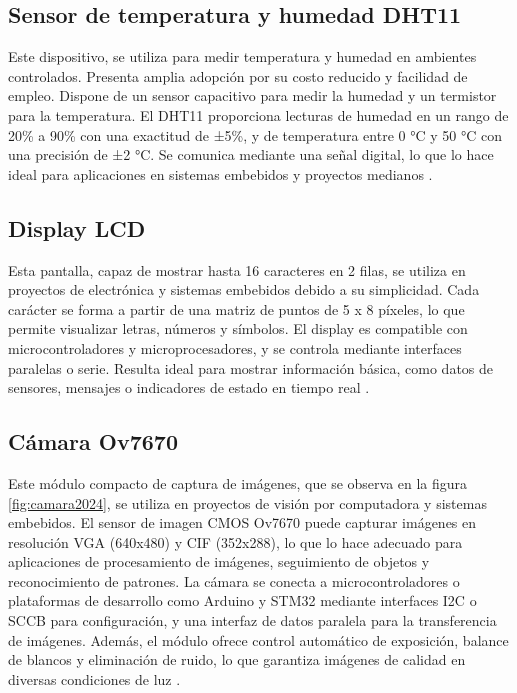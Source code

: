 \subsection{Sensor de temperatura y humedad DHT11}
\label{subsec:dht11}

Este dispositivo, se utiliza para medir temperatura y humedad en ambientes controlados. Presenta amplia adopción por su costo reducido y facilidad de empleo. Dispone de un sensor capacitivo para medir la humedad y un termistor para la temperatura. El DHT11 proporciona lecturas de humedad en un rango de 20\% a 90\% con una exactitud de ±5\%, y de temperatura entre 0 °C y 50 °C con una precisión de ±2 °C. Se comunica mediante una señal digital, lo que lo hace ideal para aplicaciones en sistemas embebidos y proyectos medianos \citep{WEBSITE:Dht112024}.

\subsection{Display LCD}
\label{subsec:DisplayLCD}

Esta pantalla, capaz de mostrar hasta 16 caracteres en 2 filas, se utiliza en proyectos de electrónica y sistemas embebidos debido a su simplicidad. Cada carácter se forma a partir de una matriz de puntos de 5 x 8 píxeles, lo que permite visualizar letras, números y símbolos. El display es compatible con microcontroladores y microprocesadores, y se controla mediante interfaces paralelas o serie. Resulta ideal para mostrar información básica, como datos de sensores, mensajes o indicadores de estado en tiempo real \citep{WEBSITE:lcd2024}.

\subsection{Cámara Ov7670}
\label{subsec:camara}

Este módulo compacto de captura de imágenes, que se observa en la figura \ref{fig:camara2024}, se utiliza en proyectos de visión por computadora y sistemas embebidos. El sensor de imagen CMOS Ov7670 puede capturar imágenes en resolución VGA (640x480) y CIF (352x288), lo que lo hace adecuado para aplicaciones de procesamiento de imágenes, seguimiento de objetos y reconocimiento de patrones. La cámara se conecta a microcontroladores o plataformas de desarrollo como Arduino y STM32 mediante interfaces I2C o SCCB para configuración, y una interfaz de datos paralela para la transferencia de imágenes. Además, el módulo ofrece control automático de exposición, balance de blancos y eliminación de ruido, lo que garantiza imágenes de calidad en diversas condiciones de luz \citep{WEBSITE:camara2024}.

